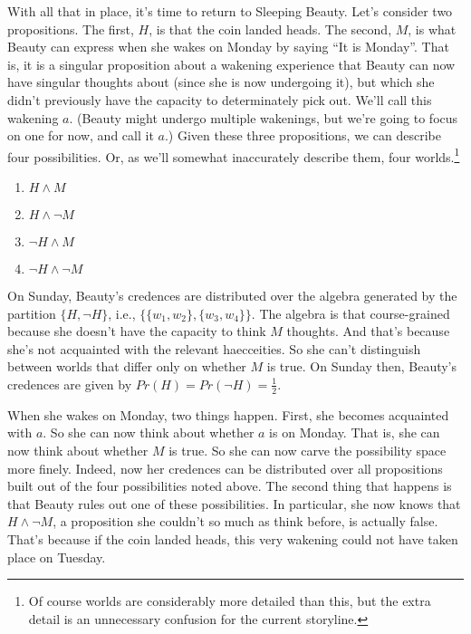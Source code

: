 With all that in place, it's time to return to Sleeping Beauty. Let's consider two propositions. The first, \(H\), is that the coin landed heads. The second, \(M\), is what Beauty can express when she wakes on Monday by saying ``It is Monday''. That is, it is a singular proposition about a wakening experience that Beauty can now have singular thoughts about (since she is now undergoing it), but which she didn't previously have the capacity to determinately pick out. We'll call this wakening \(a\). (Beauty might undergo multiple wakenings, but we're going to focus on one for now, and call it \(a\).) Given these three propositions, we can describe four possibilities. Or, as we'll somewhat inaccurately describe them, four worlds.\footnote{Of course worlds are considerably more detailed than this, but the extra detail is an unnecessary confusion for the current storyline.}

\renewcommand{\labelenumi}{\(w_{\arabic{enumi}}\):}
\begin{enumerate}
\item \(H \wedge M\)
\item \(H \wedge \neg M\)
\item \(\neg H \wedge M\)
\item \(\neg H \wedge \neg M\)
\end{enumerate}

\noindent On Sunday, Beauty's credences are distributed over the algebra generated by the partition \(\{H, \neg H\}\), i.e., \(\{\{w_1, w_2\}, \{w_3, w_4\}\}\). The algebra is that course-grained because she doesn't have the capacity to think \(M\) thoughts. And that's because she's not acquainted with the relevant haecceities. So she can't distinguish between worlds that differ only on whether \(M\) is true. On Sunday then, Beauty's credences are given by \(Pr(H) = Pr(\neg H) = \frac{1}{2}\).

When she wakes on Monday, two things happen. First, she becomes acquainted with \(a\). So she can now think about whether \(a\) is on Monday. That is, she can now think about whether \(M\) is true. So she can now carve the possibility space more finely. Indeed, now her credences can be distributed over all propositions built out of the four possibilities noted above. The second thing that happens is that Beauty rules out one of these possibilities. In particular, she now knows that \(H \wedge \neg M\), a proposition she couldn't so much as think before, is actually false. That's because if the coin landed heads, this very wakening could not have taken place on Tuesday.

